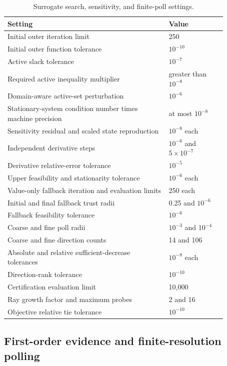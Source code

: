 \begin{table}[htbp]
\centering\small
\caption{Surrogate search, sensitivity, and finite-poll settings.}\label{tab:plant_surrogate_search_settings}
\begin{tabular}{p{0.64\linewidth}p{0.23\linewidth}}
\toprule Setting & Value\\\midrule
Initial outer iteration limit & 250\\
Initial outer function tolerance & $10^{-10}$\\
Active slack tolerance & $10^{-7}$\\
Required active inequality multiplier & greater than $10^{-8}$\\
Domain-aware active-set perturbation & $10^{-6}$\\
Stationary-system condition number times machine precision & at most $10^{-8}$\\
Sensitivity residual and scaled state reproduction & $10^{-8}$ each\\
Independent derivative steps & $10^{-6}$ and $5\times10^{-7}$\\
Derivative relative-error tolerance & $10^{-5}$\\
Upper feasibility and stationarity tolerance & $10^{-6}$ each\\
Value-only fallback iteration and evaluation limits & 250 each\\
Initial and final fallback trust radii & 0.25 and $10^{-6}$\\
Fallback feasibility tolerance & $10^{-6}$\\
Coarse and fine poll radii & $10^{-3}$ and $10^{-4}$\\
Coarse and fine direction counts & 14 and 106\\
Absolute and relative sufficient-decrease tolerances & $10^{-8}$ each\\
Direction-rank tolerance & $10^{-10}$\\
Certification evaluation limit & 10{,}000\\
Ray growth factor and maximum probes & 2 and 16\\
Objective relative tie tolerance & $10^{-10}$\\
\bottomrule
\end{tabular}
\end{table}

\subsection{First-order evidence and finite-resolution polling}

